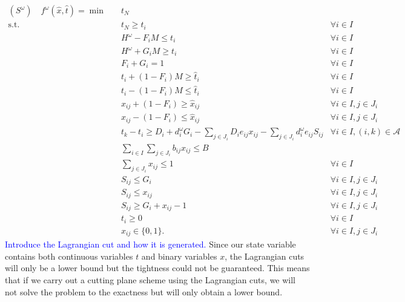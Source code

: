 \documentclass[11pt]{article}
\begin{document}
	\begin{subequations}
		\label{prob:sub}
		\begin{align}
			(S^\omega) \quad f^\omega(\hat{x},\hat{t}) = \min \quad & t_N & \\
			\text{s.t.} \quad & t_N \geq t_i & \forall i \in I \\
			& H^\omega - F_i M \leq t_i & \forall i \in I \\
			& H^\omega + G_i M \geq t_i & \forall i \in I \\
			& F_i + G_i = 1 & \forall i \in I \\
			& t_i + (1-F_i) M \geq \hat{t}_i & \forall i \in I\\
			& t_i - (1-F_i) M \leq \hat{t}_i & \forall i \in I \\
			& x_{ij} + (1-F_i) \geq \hat{x}_{ij} & \forall i \in I, j \in J_i \\
			& x_{ij} - (1-F_i) \leq \hat{x}_{ij} & \forall i \in I, j \in J_i \\
			& t_k - t_i \geq D_i + d_i^\omega G_i -\sum_{j \in J_i} D_i e_{ij} x_{ij} - \sum_{j \in J_i} d_i^\omega e_{ij} S_{ij} & \forall i \in I, (i,k) \in \mathcal{A}\\
			&\sum_{i \in I} \sum_{j \in J_i} b_{ij} x_{ij} \leq B &\\
			& \sum_{j \in J_i} x_{ij} \leq 1 & \forall i \in I\\
			& S_{ij} \leq G_i & \forall i \in I, j \in J_i \\
			& S_{ij} \leq x_{ij} & \forall i \in I, j \in J_i\\
			& S_{ij} \geq G_i + x_{ij} - 1 & \forall i \in I, j \in J_i\\
			& t_i \geq 0 & \forall i \in I \\
			& x_{ij} \in \{0,1\}. & \forall i \in I, j \in J_i
		\end{align}
	\end{subequations}
	\textcolor{blue}{Introduce the Lagrangian cut and how it is generated.}
	Since our state variable contains both continuous variables \(t\) and binary variables \(x\), the Lagrangian cuts will only be a lower bound but the tightness could not be guaranteed. This means that if we carry out a cutting plane scheme using the Lagrangian cuts, we will not solve the problem to the exactness but will only obtain a lower bound. \\
	\newline
\end{document}
